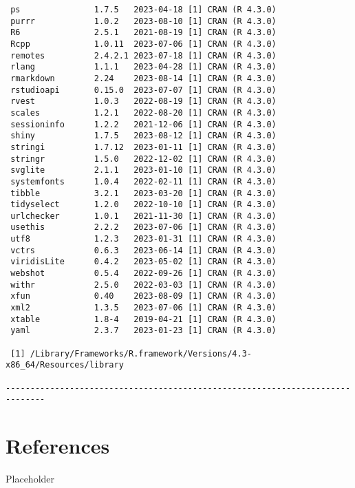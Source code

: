 \documentclass[twoside,12pt,final]{ucthesis-CA2012}
\begin{document}
\begin{ucmainmatter}
\begin{verbatim}
 ps               1.7.5   2023-04-18 [1] CRAN (R 4.3.0)
 purrr            1.0.2   2023-08-10 [1] CRAN (R 4.3.0)
 R6               2.5.1   2021-08-19 [1] CRAN (R 4.3.0)
 Rcpp             1.0.11  2023-07-06 [1] CRAN (R 4.3.0)
 remotes          2.4.2.1 2023-07-18 [1] CRAN (R 4.3.0)
 rlang            1.1.1   2023-04-28 [1] CRAN (R 4.3.0)
 rmarkdown        2.24    2023-08-14 [1] CRAN (R 4.3.0)
 rstudioapi       0.15.0  2023-07-07 [1] CRAN (R 4.3.0)
 rvest            1.0.3   2022-08-19 [1] CRAN (R 4.3.0)
 scales           1.2.1   2022-08-20 [1] CRAN (R 4.3.0)
 sessioninfo      1.2.2   2021-12-06 [1] CRAN (R 4.3.0)
 shiny            1.7.5   2023-08-12 [1] CRAN (R 4.3.0)
 stringi          1.7.12  2023-01-11 [1] CRAN (R 4.3.0)
 stringr          1.5.0   2022-12-02 [1] CRAN (R 4.3.0)
 svglite          2.1.1   2023-01-10 [1] CRAN (R 4.3.0)
 systemfonts      1.0.4   2022-02-11 [1] CRAN (R 4.3.0)
 tibble           3.2.1   2023-03-20 [1] CRAN (R 4.3.0)
 tidyselect       1.2.0   2022-10-10 [1] CRAN (R 4.3.0)
 urlchecker       1.0.1   2021-11-30 [1] CRAN (R 4.3.0)
 usethis          2.2.2   2023-07-06 [1] CRAN (R 4.3.0)
 utf8             1.2.3   2023-01-31 [1] CRAN (R 4.3.0)
 vctrs            0.6.3   2023-06-14 [1] CRAN (R 4.3.0)
 viridisLite      0.4.2   2023-05-02 [1] CRAN (R 4.3.0)
 webshot          0.5.4   2022-09-26 [1] CRAN (R 4.3.0)
 withr            2.5.0   2022-03-03 [1] CRAN (R 4.3.0)
 xfun             0.40    2023-08-09 [1] CRAN (R 4.3.0)
 xml2             1.3.5   2023-07-06 [1] CRAN (R 4.3.0)
 xtable           1.8-4   2019-04-21 [1] CRAN (R 4.3.0)
 yaml             2.3.7   2023-01-23 [1] CRAN (R 4.3.0)

 [1] /Library/Frameworks/R.framework/Versions/4.3-x86_64/Resources/library

------------------------------------------------------------------------------
\end{verbatim}
\hypertarget{references}{%
\chapter*{References}\label{references}}

Placeholder

\end{ucmainmatter}
\end{document}
